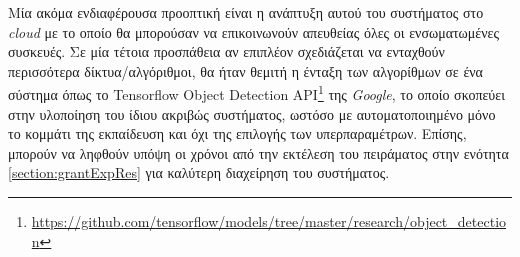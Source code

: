 Μία ακόμα ενδιαφέρουσα προοπτική είναι η ανάπτυξη αυτού του συστήματος στο \textit{cloud} με το οποίο θα μπορούσαν να επικοινωνούν απευθείας όλες οι ενσωματωμένες συσκευές. Σε μία τέτοια προσπάθεια αν επιπλέον σχεδιάζεται να ενταχθούν περισσότερα δίκτυα/αλγόριθμοι, θα ήταν θεμιτή η ένταξη των αλγορίθμων σε ένα σύστημα όπως το Tensorflow Object Detection API\footnote{\url{https://github.com/tensorflow/models/tree/master/research/object_detection}} της \textit{Google}, το οποίο σκοπεύει στην υλοποίηση του ίδιου ακριβώς συστήματος, ωστόσο με αυτοματοποιημένο μόνο το κομμάτι της εκπαίδευση και όχι της επιλογής των υπερπαραμέτρων. Επίσης, μπορούν να ληφθούν υπόψη οι χρόνοι από την εκτέλεση του πειράματος στην ενότητα \ref{section:grantExpRes} για καλύτερη διαχείρηση του συστήματος.